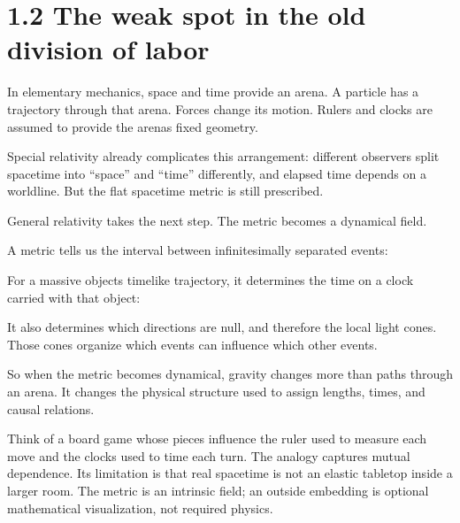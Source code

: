 \documentclass[
  11pt,
  letterpaper,
  oneside,
  openany]{scrbook}
\begin{document}
\hypertarget{the-weak-spot-in-the-old-division-of-labor}{%
\section{1.2 The weak spot in the old division of
labor}\label{the-weak-spot-in-the-old-division-of-labor}}

In elementary mechanics, space and time provide an arena. A particle has
a trajectory through that arena. Forces change its motion. Rulers and
clocks are assumed to provide the arena\textquotesingle s fixed
geometry.

Special relativity already complicates this arrangement: different
observers split spacetime into ``space'' and ``time'' differently, and
elapsed time depends on a worldline. But the flat spacetime metric is
still prescribed.

General relativity takes the next step. The metric becomes a dynamical
field.

A metric tells us the interval between infinitesimally separated events:

\begin{center}
\begingroup
{}
\ifdim\wd\grmathbox>\linewidth
\resizebox{\linewidth}{!}{\usebox{\grmathbox}}
\else\usebox{\grmathbox}\fi
\endgroup
\end{center}

For a massive object\textquotesingle s timelike trajectory, it
determines the time on a clock carried with that object:

\begin{center}
\begingroup
{}
\ifdim\wd\grmathbox>\linewidth
\resizebox{\linewidth}{!}{\usebox{\grmathbox}}
\else\usebox{\grmathbox}\fi
\endgroup
\end{center}

It also determines which directions are null, and therefore the local
light cones. Those cones organize which events can influence which other
events.

So when the metric becomes dynamical, gravity changes more than paths
through an arena. It changes the physical structure used to assign
lengths, times, and causal relations.

Think of a board game whose pieces influence the ruler used to measure
each move and the clocks used to time each turn. The analogy captures
mutual dependence. Its limitation is that real spacetime is not an
elastic tabletop inside a larger room. The metric is an intrinsic field;
an outside embedding is optional mathematical visualization, not
required physics.
\end{document}
